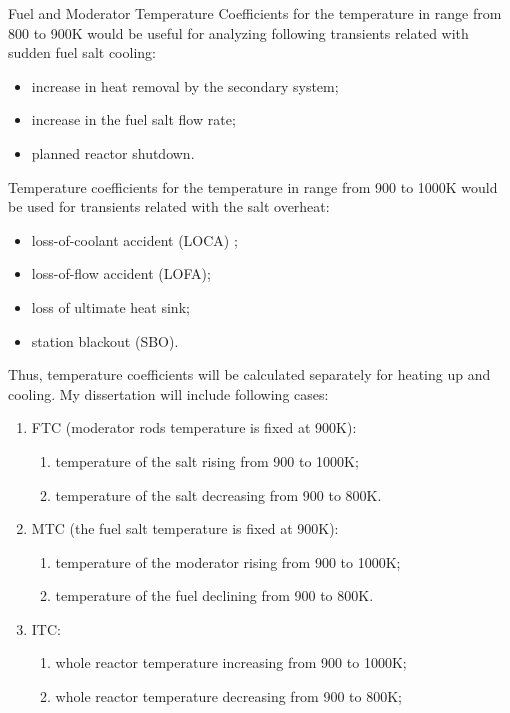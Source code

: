 Fuel and Moderator Temperature Coefficients for the temperature in range 
from 800 to 900K would be useful for analyzing following transients 
related with sudden fuel salt cooling: 
\begin{itemize}
	\item increase in heat removal by the secondary system;
	\item increase in the fuel salt flow rate;
	\item planned reactor shutdown.
\end{itemize}
Temperature coefficients for the temperature in range from 900 to 1000K 
would be used for transients related with the salt overheat: 
\begin{itemize}
	\item loss-of-coolant accident (LOCA) ;
	\item loss-of-flow accident (LOFA);
	\item loss of ultimate heat sink;
	\item  station blackout (SBO).
\end{itemize}
Thus, temperature coefficients will be calculated separately for heating up 
and cooling. My dissertation will include following  cases: 
\begin{enumerate}
	\item FTC (moderator rods temperature is fixed at 900K):
		\begin{enumerate}[label=(\alph*)]
			\item temperature of the salt rising from 900 to 1000K;
			\item temperature of the salt decreasing from 900 to 800K.
		\end{enumerate}
	\item MTC (the fuel salt temperature is fixed at 900K): 
		\begin{enumerate}[label=(\alph*)]
			\item temperature of the moderator rising from 900 to 1000K;
			\item temperature of the fuel declining from 900 to 800K.
		\end{enumerate}
	\item ITC: 
		\begin{enumerate}[label=(\alph*)]
			\item whole reactor temperature increasing from 900 to 1000K;
			\item whole reactor temperature decreasing from 900 to 800K;
		\end{enumerate}
\end{enumerate}

